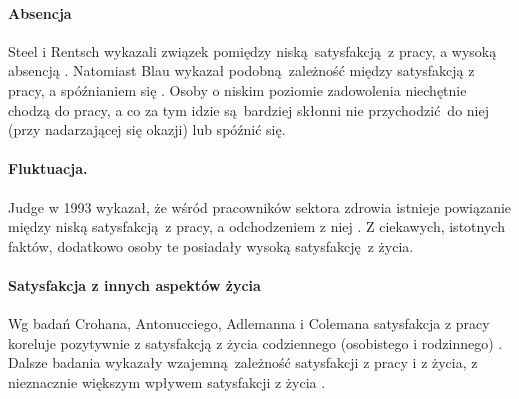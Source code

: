 \paragraph{Absencja} Steel i Rentsch wykazali związek pomiędzy niską satysfakcją z pracy, a wysoką absencją \citep{steel1995influence}. Natomiast Blau wykazał podobną zależność między satysfakcją z pracy, a spóźnianiem się \citep{blau1994developing}. Osoby o niskim poziomie zadowolenia niechętnie chodzą do pracy, a co za tym idzie są bardziej skłonni nie przychodzić do niej (przy nadarzającej się okazji) lub spóźnić się.  \paragraph{Fluktuacja.} Judge w 1993
wykazał, że wśród pracowników sektora zdrowia istnieje powiązanie między niską satysfakcją z pracy, a odchodzeniem z niej \citep{judge1993does}. Z ciekawych, istotnych faktów, dodatkowo osoby te posiadały wysoką satysfakcję z życia.
\paragraph{Satysfakcja z innych aspektów życia} Wg badań Crohana, Antonucciego, Adlemanna i Colemana satysfakcja z pracy koreluje pozytywnie z satysfakcją z życia codziennego (osobistego i rodzinnego) \citep{crohan1989job}. Dalsze badania wykazały wzajemną zależność satysfakcji z pracy i z życia, z nieznacznie większym wpływem satysfakcji z życia \citep{judge1993another}. 
